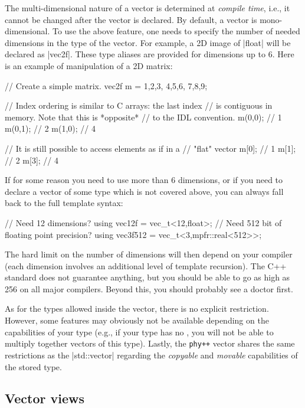\documentclass[12pt]{report}
\newcommand{\phypp}{\texttt{phy++}\xspace}
\newcommand{\stdvec}{\cppinline|std::vector|\xspace}
\newenvironment{advanced}
{
    \begin{mdframed}[style=advanced,frametitle={Advanced}]
}
{
    \end{mdframed}
}
\begin{document}
The multi-dimensional nature of a vector is determined at \emph{compile time}, i.e., it cannot be changed after the vector is declared. By default, a vector is mono-dimensional. To use the above feature, one needs to specify the number of needed dimensions in the type of the vector. For example, a 2D image of \cppinline|float| will be declared as \cppinline|vec2f|. These type aliases are provided for dimensions up to $6$. Here is an example of manipulation of a 2D matrix:

\begin{cppcode}
// Create a simple matrix.
vec2f m = {{1,2,3}, {4,5,6}, {7,8,9}};

// Index ordering is similar to C arrays: the last index
// is contiguous in memory. Note that this is *opposite*
// to the IDL convention.
m(0,0); // 1
m(0,1); // 2
m(1,0); // 4

// It is still possible to access elements as if in a
// "flat" vector
m[0]; // 1
m[1]; // 2
m[3]; // 4
\end{cppcode}

\begin{advanced}
If for some reason you need to use more than 6 dimensions, or if you need to declare a vector of some type which is not covered above, you can always fall back to the full template syntax:
\begin{cppcode}
// Need 12 dimensions?
using vec12f = vec_t<12,float>;
// Need 512 bit of floating point precision?
using vec3f512 = vec_t<3,mpfr::real<512>>;
\end{cppcode}

The hard limit on the number of dimensions will then depend on your compiler (each dimension involves an additional level of template recursion). The C++ standard does not guarantee anything, but you should be able to go as high as 256 on all major compilers. Beyond this, you should probably see a doctor first.

As for the types allowed inside the vector, there is no explicit restriction. However, some features may obviously not be available depending on the capabilities of your type (e.g., if your type has no , you will not be able to multiply together vectors of this type). Lastly, the \phypp vector shares the same restrictions as the \stdvec regarding the \emph{copyable} and \emph{movable} capabilities of the stored type.
\end{advanced}

\subsection{Vector views \label{SEC:core:overview:views}}
\end{document}
